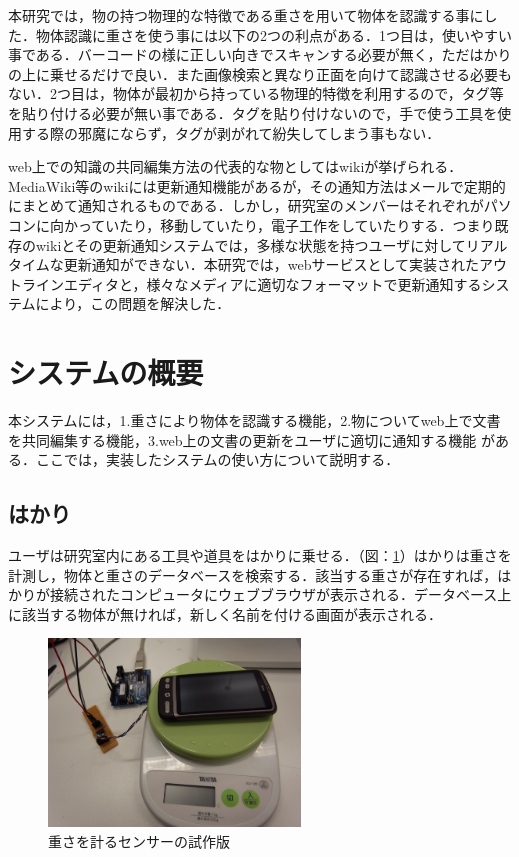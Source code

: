 本研究では，物の持つ物理的な特徴である重さを用いて物体を認識する事にした．物体認識に重さを使う事には以下の2つの利点がある．1つ目は，使いやすい事である．バーコードの様に正しい向きでスキャンする必要が無く，ただはかりの上に乗せるだけで良い．また画像検索と異なり正面を向けて認識させる必要もない．2つ目は，物体が最初から持っている物理的特徴を利用するので，タグ等を貼り付ける必要が無い事である．タグを貼り付けないので，手で使う工具を使用する際の邪魔にならず，タグが剥がれて紛失してしまう事もない．

web上での知識の共同編集方法の代表的な物としてはwikiが挙げられる．MediaWiki\cite{mediawiki}等のwikiには更新通知機能があるが，その通知方法はメールで定期的にまとめて通知されるものである．しかし，研究室のメンバーはそれぞれがパソコンに向かっていたり，移動していたり，電子工作をしていたりする．つまり既存のwikiとその更新通知システムでは，多様な状態を持つユーザに対してリアルタイムな更新通知ができない．本研究では，webサービスとして実装されたアウトラインエディタと，様々なメディアに適切なフォーマットで更新通知するシステムにより，この問題を解決した．


\section{システムの概要}
本システムには，1.重さにより物体を認識する機能，2.物についてweb上で文書を共同編集する機能，3.web上の文書の更新をユーザに適切に通知する機能 がある．ここでは，実装したシステムの使い方について説明する．

\subsection{はかり}

ユーザは研究室内にある工具や道具をはかりに乗せる．（図：\ref{fig:sensor}）はかりは重さを計測し，物体と重さのデータベースを検索する．該当する重さが存在すれば，はかりが接続されたコンピュータにウェブブラウザが表示される．データベース上に該当する物体が無ければ，新しく名前を付ける画面が表示される．

\begin{figure}
  \begin{center}
    \includegraphics[height=50mm]{img/sensor.png}
  \end{center}
  \caption{重さを計るセンサーの試作版}
  \label{fig:sensor}
\end{figure}

